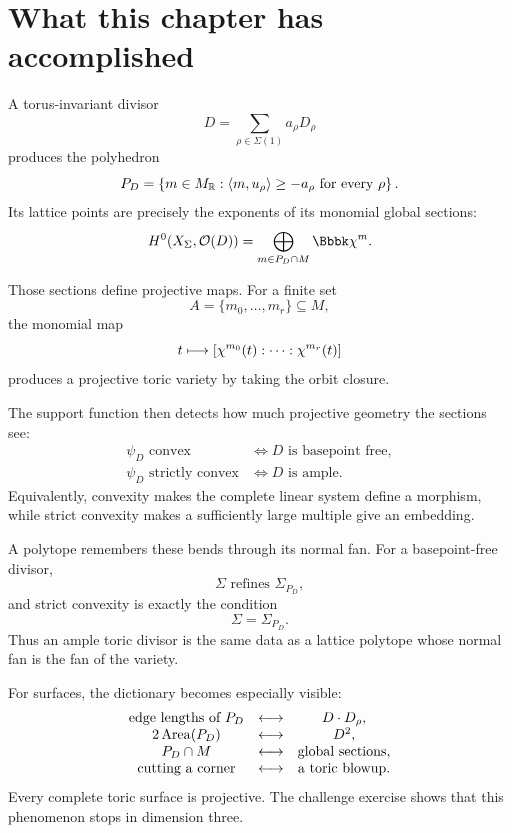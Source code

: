 \clearpage
\section*{What this chapter has accomplished}

A torus-invariant divisor
\[
D=\sum_{\rho\in\Sigma(1)}a_\rho D_\rho
\]
produces the polyhedron
\[
P_D
=
\left\{
 m\in M_{\mathbb{R}}:
 \langle m,u_\rho\rangle\geq-a_\rho
 \text{ for every }\rho
\right\}.
\]
Its lattice points are precisely the exponents of its monomial global
sections:
\[
H^0(X_\Sigma,\mathcal O(D))
=
\bigoplus_{m\in P_D\cap M}\Bbbk\character{m}.
\]

Those sections define projective maps. For a finite set
\[
A=\{m_0,\ldots,m_r\}\subseteq M,
\]
the monomial map
\[
t\longmapsto
[\chi^{m_0}(t):\cdots:\chi^{m_r}(t)]
\]
produces a projective toric variety by taking the orbit closure.

The support function then detects how much projective geometry the
sections see:
\[
\boxed{
\begin{aligned}
\psi_D\text{ convex}
&\Longleftrightarrow
D\text{ is basepoint free},
\\
\psi_D\text{ strictly convex}
&\Longleftrightarrow
D\text{ is ample}.
\end{aligned}
}
\]
Equivalently, convexity makes the complete linear system define a
morphism, while strict convexity makes a sufficiently large multiple
give an embedding.

A polytope remembers these bends through its normal fan. For a
basepoint-free divisor,
\[
\Sigma\text{ refines }\Sigma_{P_D},
\]
and strict convexity is exactly the condition
\[
\Sigma=\Sigma_{P_D}.
\]
Thus an ample toric divisor is the same data as a lattice polytope
whose normal fan is the fan of the variety.

For surfaces, the dictionary becomes especially visible:
\[
\begin{array}{c@{\quad\longleftrightarrow\quad}c}
\text{edge lengths of }P_D
&
D\cdot D_\rho,
\\
2\operatorname{Area}(P_D)
&
D^2,
\\
P_D\cap M
&
\text{global sections},
\\
\text{cutting a corner}
&
\text{a toric blowup}.
\end{array}
\]
Every complete toric surface is projective. The challenge exercise
shows that this phenomenon stops in dimension three.

